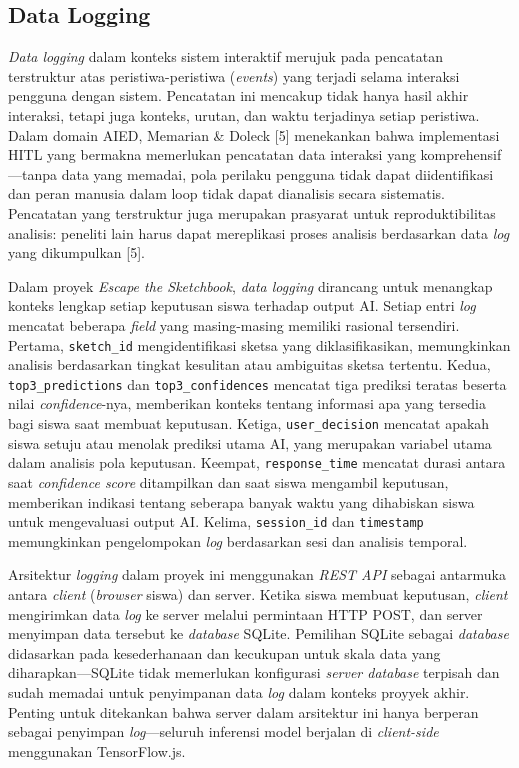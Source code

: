 \documentclass[12pt,oneside]{report}
\begin{document}
\subsection{Data Logging}
\label{subsec:data-logging}

\textit{Data logging} dalam konteks sistem interaktif merujuk pada pencatatan terstruktur atas peristiwa-peristiwa (\textit{events}) yang terjadi selama interaksi pengguna dengan sistem. Pencatatan ini mencakup tidak hanya hasil akhir interaksi, tetapi juga konteks, urutan, dan waktu terjadinya setiap peristiwa. Dalam domain AIED, Memarian \& Doleck [5] menekankan bahwa implementasi HITL yang bermakna memerlukan pencatatan data interaksi yang komprehensif—tanpa data yang memadai, pola perilaku pengguna tidak dapat diidentifikasi dan peran manusia dalam loop tidak dapat dianalisis secara sistematis. Pencatatan yang terstruktur juga merupakan prasyarat untuk reproduktibilitas analisis: peneliti lain harus dapat mereplikasi proses analisis berdasarkan data \textit{log} yang dikumpulkan [5].

Dalam proyek \textit{Escape the Sketchbook}, \textit{data logging} dirancang untuk menangkap konteks lengkap setiap keputusan siswa terhadap output AI. Setiap entri \textit{log} mencatat beberapa \textit{field} yang masing-masing memiliki rasional tersendiri. Pertama, \texttt{sketch\_id} mengidentifikasi sketsa yang diklasifikasikan, memungkinkan analisis berdasarkan tingkat kesulitan atau ambiguitas sketsa tertentu. Kedua, \texttt{top3\_predictions} dan \texttt{top3\_confidences} mencatat tiga prediksi teratas beserta nilai \textit{confidence}-nya, memberikan konteks tentang informasi apa yang tersedia bagi siswa saat membuat keputusan. Ketiga, \texttt{user\_decision} mencatat apakah siswa setuju atau menolak prediksi utama AI, yang merupakan variabel utama dalam analisis pola keputusan. Keempat, \texttt{response\_time} mencatat durasi antara saat \textit{confidence score} ditampilkan dan saat siswa mengambil keputusan, memberikan indikasi tentang seberapa banyak waktu yang dihabiskan siswa untuk mengevaluasi output AI. Kelima, \texttt{session\_id} dan \texttt{timestamp} memungkinkan pengelompokan \textit{log} berdasarkan sesi dan analisis temporal.

Arsitektur \textit{logging} dalam proyek ini menggunakan \textit{REST API} sebagai antarmuka antara \textit{client} (\textit{browser} siswa) dan server. Ketika siswa membuat keputusan, \textit{client} mengirimkan data \textit{log} ke server melalui permintaan HTTP POST, dan server menyimpan data tersebut ke \textit{database} SQLite. Pemilihan SQLite sebagai \textit{database} didasarkan pada kesederhanaan dan kecukupan untuk skala data yang diharapkan—SQLite tidak memerlukan konfigurasi \textit{server database} terpisah dan sudah memadai untuk penyimpanan data \textit{log} dalam konteks proyyek akhir. Penting untuk ditekankan bahwa server dalam arsitektur ini hanya berperan sebagai penyimpan \textit{log}—seluruh inferensi model berjalan di \textit{client-side} menggunakan TensorFlow.js.
\end{document}
